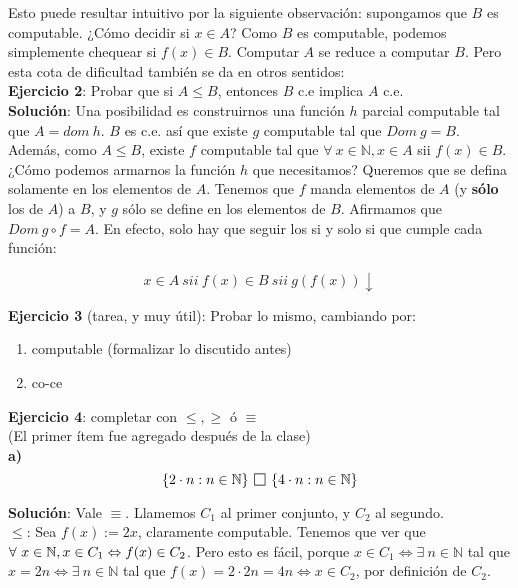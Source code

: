 \documentclass[10pt,a4paper]{article}
\def\key#1{\{#1\}}
\def\N{\mathbb{N}}
\def\bs{\mathlarger{\mathlarger{\square}}}
\begin{document}
Esto puede resultar intuitivo por la siguiente observación: supongamos que $B$ es computable. ¿Cómo decidir si $x \in A$? Como $B$ es computable, podemos simplemente chequear si $f(x) \in B$. Computar $A$ se reduce a computar $B$. Pero esta cota de dificultad también se da en otros sentidos:\\
	
	\textbf{Ejercicio 2}: Probar que si $A \leq B$, entonces $B$ c.e implica $A$ c.e.\\
	
\textbf{Solución}: Una posibilidad es construirnos una función $h$ parcial computable tal que $A = dom\ h$. $B$ es c.e. así que existe $g$ computable tal que $Dom\ g = B$. Además, como $A\leq B$, existe $f$ computable tal que $\forall\ x \in \N, x \in A$ sii $f(x) \in B$. ¿Cómo podemos armarnos la función $h$ que necesitamos? Queremos que se defina solamente en los elementos de $A$. Tenemos que $f$ manda elementos de $A$ (y \textbf{sólo} los de $A$) a $B$, y $g$ sólo se define en los elementos de $B$. Afirmamos que $Dom\ g\circ f = A$. En efecto, solo hay que seguir los si y solo si que cumple cada función:

$$x \in A\ sii\ f(x) \in B\ sii\ g(f(x)) \downarrow$$
	
	\textbf{Ejercicio 3} (tarea, y muy útil): Probar lo mismo, cambiando  por:
	\begin{enumerate}
		\item computable (formalizar lo discutido antes)
		\item co-ce
	\end{enumerate}


	\textbf{Ejercicio 4}: completar con $\leq, \geq$ ó $\equiv$\\
	
	
	(El primer ítem fue agregado después de la clase)\\



\textbf{a)}
	\begin{equation*}
	\key{2\cdot n : n \in \N}\ \raisebox{-1pt}{$\bs$} \ \key{4\cdot n : n \in \N}
	\end{equation*}
	
	\textbf{Solución}: Vale $\equiv$. Llamemos $C_1$ al primer conjunto, y $C_2$ al segundo.\\
	
	$\leq$: Sea $f(x) := 2x$, claramente computable. Tenemos que ver que $\forall\ x\in \N,\\ x \in C_1 \Leftrightarrow f(x) \in C_2$. Pero esto es fácil, porque $x \in C_1 \Leftrightarrow \exists\ n\in \N$ tal que $x = 2n \Leftrightarrow \exists\ n\in \N$ tal que $f(x) = 2\cdot 2n = 4n \Leftrightarrow x \in C_2$, por definición de $C_2$.\\
	
\end{document}
